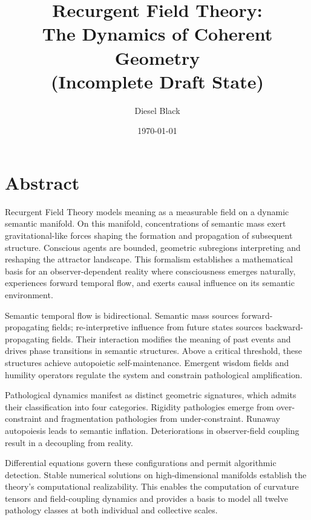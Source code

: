 \documentclass[11pt, a4paper]{report}
\title{Recurgent Field Theory: \\ The Dynamics of Coherent Geometry \\ \vspace{1em} \small{(Incomplete Draft State)}}
\author{Diesel Black}
\date{\today}
\begin{document}

\maketitle

\section*{Abstract}

Recurgent Field Theory models meaning as a measurable field on a dynamic semantic manifold. On this manifold, concentrations of semantic mass exert gravitational-like forces shaping the formation and propagation of subsequent structure. Conscious agents are bounded, geometric subregions interpreting and reshaping the attractor landscape. This formalism establishes a mathematical basis for an observer-dependent reality where consciousness emerges naturally, experiences forward temporal flow, and exerts causal influence on its semantic environment.

\vspace{1em}

Semantic temporal flow is bidirectional. Semantic mass sources forward-propagating fields; re-interpretive influence from future states sources backward-propagating fields. Their interaction modifies the meaning of past events and drives phase transitions in semantic structures. Above a critical threshold, these structures achieve autopoietic self-maintenance. Emergent wisdom fields and humility operators regulate the system and constrain pathological amplification.

\vspace{1em}

Pathological dynamics manifest as distinct geometric signatures, which admits their classification into four categories. Rigidity pathologies emerge from over-constraint and fragmentation pathologies from under-constraint. Runaway autopoiesis leads to semantic inflation. Deteriorations in observer-field coupling result in a decoupling from reality.

\vspace{1em}

Differential equations govern these configurations and permit algorithmic detection. Stable numerical solutions on high-dimensional manifolds establish the theory's computational realizability. This enables the computation of curvature tensors and field-coupling dynamics and provides a basis to model all twelve pathology classes at both individual and collective scales.
\end{document}
